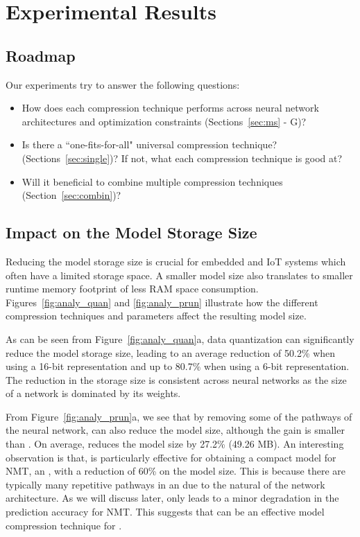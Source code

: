 \section{Experimental Results}


\subsection{Roadmap}
Our experiments try to answer the following questions:

\begin{itemize}
\item How does each compression technique performs across neural network architectures and optimization constraints
    (Sections~\ref{sec:ms} - G)?
\item Is there a ``one-fits-for-all" universal compression technique? (Sections~\ref{sec:single})? If not, what each compression
    technique is good at?
\item Will it beneficial to combine multiple compression techniques (Section~\ref{sec:combin})?
\end{itemize}

\subsection{Impact on the Model Storage Size\label{sec:ms}}
Reducing the model storage size is crucial for embedded and IoT systems which often have a limited storage space. A smaller model size also
translates to smaller runtime memory footprint of less RAM space consumption. Figures~\ref{fig:analy_quan} and  \ref{fig:analy_prun}
illustrate how the different compression techniques and parameters affect the resulting model size.

As can be seen from Figure~\ref{fig:analy_quan}a, data quantization can significantly reduce the model storage size, leading to an average
reduction of 50.2\% when using a 16-bit representation and up to 80.7\% when using a 6-bit representation. The reduction in the storage
size is consistent across neural networks as the size of a network is dominated by its weights.

From Figure~\ref{fig:analy_prun}a, we see that by removing some of the pathways of the neural network, \pruning can also reduce the model
size, although the gain is smaller than \quantization. On average, \pruning reduces the model size by 27.2\% (49.26 MB). An interesting
observation is that, \pruning is particularly effective for obtaining a compact model for NMT, an \RNN, with a reduction of 60\% on the
model size. This is because there are typically many repetitive pathways in an \RNN due to the natural of the network architecture. As we
will discuss later, \pruning only leads to a minor degradation in the prediction accuracy for NMT. This suggests that \pruning can be an
effective model compression technique for \RNNs.



